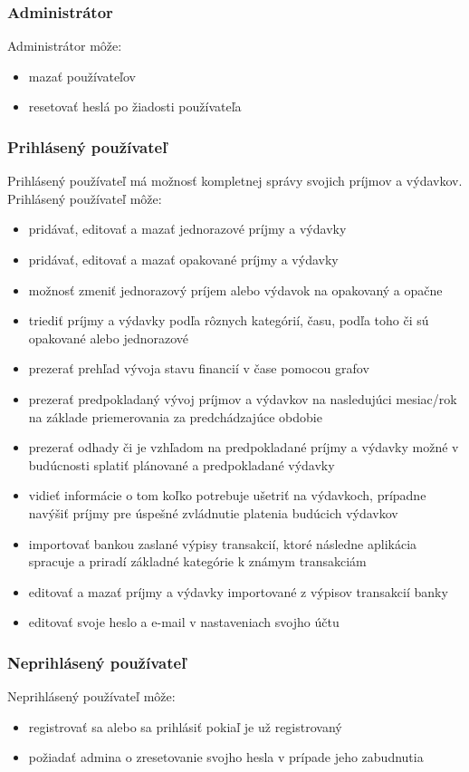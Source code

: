 \documentclass[12pt,oneside]{book}
\begin{document}
\subsubsection{Administrátor}
Administrátor môže:
\begin{itemize}
\item{mazať používateľov}
\item{resetovať heslá po žiadosti používateľa}
\end{itemize}

\subsubsection{Prihlásený používateľ}
Prihlásený používateľ má možnosť kompletnej správy svojich príjmov a výdavkov.
Prihlásený používateľ môže:
\begin{itemize}
\item{pridávať, editovať a mazať jednorazové príjmy a výdavky}
\item{pridávať, editovať a mazať opakované príjmy a výdavky}
\item{možnosť zmeniť jednorazový príjem alebo výdavok na opakovaný a opačne}
\item{triediť príjmy a výdavky podľa rôznych kategórií, času, podľa toho či sú opakované alebo jednorazové}
\item{prezerať prehľad vývoja stavu financií v čase pomocou grafov}
\item{prezerať  predpokladaný vývoj príjmov a výdavkov na nasledujúci mesiac/rok na základe priemerovania za predchádzajúce obdobie}
\item{prezerať odhady či je vzhľadom na predpokladané príjmy a výdavky možné v budúcnosti splatiť plánované a predpokladané výdavky}
\item{vidieť informácie o tom koľko potrebuje ušetriť na výdavkoch, prípadne navýšiť príjmy pre úspešné zvládnutie platenia budúcich výdavkov}
\item{importovať bankou zaslané výpisy transakcií, ktoré následne aplikácia spracuje a priradí základné kategórie k známym transakciám}
\item{editovať a mazať príjmy a výdavky importované z výpisov transakcií banky}
\item{editovať svoje heslo a e-mail v nastaveniach svojho účtu}
\end{itemize}

\subsubsection{Neprihlásený používateľ}
Neprihlásený používateľ môže:
\begin{itemize}
\item{registrovať sa alebo sa prihlásiť pokiaľ je už registrovaný}
\item{požiadať admina o zresetovanie svojho hesla v prípade jeho zabudnutia}
\end{itemize}
\end{document}
